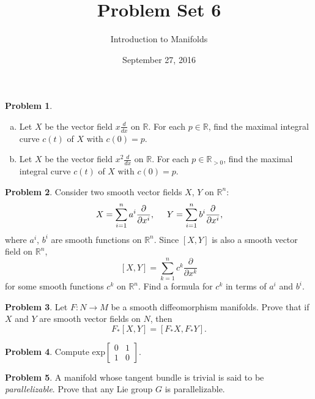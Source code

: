 \documentclass{amsart}
\newcommand{\+}[1]{\ensuremath{\mathbf{#1}}}
\newcommand{\R}{{\mathbb R}}
\theoremstyle{definition}
\newtheorem{prob}{Problem}
\begin{document}
\title{Problem Set 6}
\date{September 27, 2016}
\author{Introduction to Manifolds}

\maketitle




\begin{prob}
\begin{enumerate}[(a)]
\item  Let $X$ be the vector field
 $x \frac{d}{dx}$ on $\R$.  For each $p \in \R$, find
 the maximal integral curve $c(t)$ of $X$ with $c(0)=p$.
 \item  Let $X$ be the vector field
 $x^2 \frac{d}{dx}$ on $\R$.  For each $p \in \R_{>0}$, find
 the maximal integral curve $c(t)$ of $X$ with $c(0)=p$.
\end{enumerate}
 \end{prob}


 \begin{prob}
Consider two smooth  vector fields $X$, $Y$ on $\R^n$:
\[
X = \sum^n_{i=1} a^i \frac{\partial}{\partial x^i},  \hspace{5mm}
Y = \sum^n_{i=1} b^i \frac{\partial}{\partial x^i},
\]
where $a^i$, $b^i$ are smooth functions on $\R^n$.
Since $[X,Y]$ is also a smooth vector field on $\R^n$,
\[
[X,Y] = \sum^n_{k=1} c^k \frac{\partial}{\partial x^k}
\]
for some smooth functions $c^k$ on $\R^n$.
Find a formula for $c^k$ in terms of $a^i$ and $b^i$.
 \end{prob}

 \begin{prob}
  Let $F:N \to M$ be a smooth diffeomorphism manifolds.
  Prove that if $X$ and $Y$ are smooth vector fields on $N$,
  then 
  \[
   F_*[X,Y] = [F_*X,F_*Y].
  \]
 \end{prob}

 

\begin{prob}
 Compute 
$\text{exp} \begin{bmatrix}
0 & 1 \\ 1 & 0 
\end{bmatrix}$.
\end{prob}

\begin{prob}
 A manifold whose tangent bundle is trivial is said to be
 \emph{parallelizable}.   Prove that any
 Lie group $G$ is parallelizable.
\end{prob}
\end{document}
